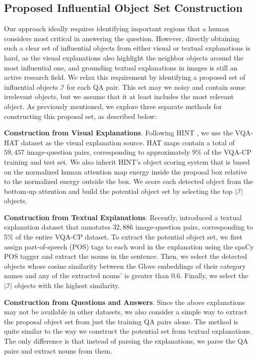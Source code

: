 \documentclass{article}
\begin{document}
\subsection{Proposed Influential Object Set Construction}
Our approach ideally requires identifying important regions that a human considers most critical in answering the question. However, directly obtaining such a clear set of influential objects from either visual or textual explanations is hard, as the visual explanations also highlight the neighbor objects around the most influential one, and grounding textual explanations in images is still an active research field. We relax this requirement by identifying a proposed set of influential objects $\mathcal{I}$ for each QA pair. This set may we noisy and contain some irrelevant objects, but we assume that it at least includes the most relevant object. As previously mentioned, we explore three separate methods for constructing this proposal set, as described below:

\noindent\textbf{Construction from Visual Explanations}. Following HINT \cite{selvaraju2019taking}, we use the VQA-HAT dataset \cite{das2017human} as the visual explanation source. HAT maps contain a total of $59,457$ image-question pairs, corresponding to approximately 9\% of the VQA-CP training and test set. We also inherit HINT's object scoring system that is based on the normalized human attention map energy inside the proposal box relative to the normalized energy outside the box. We score each detected object from the bottom-up attention and build the potential object set by selecting the top $|\mathcal{I}|$ objects.

\noindent\textbf{Construction from Textual Explanations}. Recently,  \cite{park2018multimodal} introduced a textual explanation dataset that annotates $32,886$ image-question pairs, corresponding to 5\% of the entire VQA-CP dataset. To extract the potential object set, we first assign part-of-speech (POS) tags to each word in the explanation using the spaCy POS tagger \cite{spacy2} and extract the nouns in the sentence. Then, we select the detected objects whose cosine similarity between the Glove embeddings \cite{pennington2014glove} of their category names and any of the extracted nouns' is greater than $0.6$. Finally, we select the $|\mathcal{I}|$ objects with the highest similarity.

\noindent\textbf{Construction from Questions and Answers}. Since the above explanations may not be available in other datasets, we also consider a simple way to extract the proposal object set from just the training QA pairs alone. The method is quite similar to the way we construct the potential set from textual explanations. The only difference is that instead of parsing the explanations, we parse the QA pairs and extract nouns from them.
\end{document}
